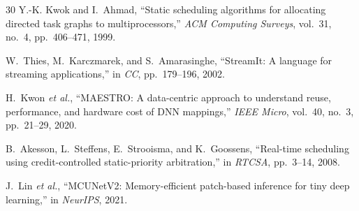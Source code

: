 \documentclass[journal]{IEEEtran}
\begin{document}
\begin{thebibliography}{30}
Y.-K. Kwok and I.~Ahmad, ``Static scheduling algorithms for allocating directed task graphs to multiprocessors,'' \emph{ACM Computing Surveys}, vol.~31, no.~4, pp.~406--471, 1999.

W.~Thies, M.~Karczmarek, and S.~Amarasinghe, ``StreamIt: A language for streaming applications,'' in \emph{CC}, pp.~179--196, 2002.

H.~Kwon \emph{et al.}, ``MAESTRO: A data-centric approach to understand reuse, performance, and hardware cost of DNN mappings,'' \emph{IEEE Micro}, vol.~40, no.~3, pp.~21--29, 2020.

B.~Akesson, L.~Steffens, E.~Strooisma, and K.~Goossens, ``Real-time scheduling using credit-controlled static-priority arbitration,'' in \emph{RTCSA}, pp.~3--14, 2008.

J.~Lin \emph{et al.}, ``MCUNetV2: Memory-efficient patch-based inference for tiny deep learning,'' in \emph{NeurIPS}, 2021.

\end{thebibliography}
\end{document}
